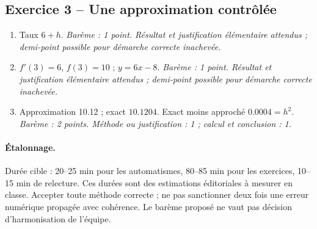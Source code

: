 \subsection*{Exercice 3 -- Une approximation contrôlée}
\begin{enumerate}
\item Taux $6+h$. \textit{Barème : 1 point. Résultat et justification élémentaire attendus ; demi-point possible pour démarche correcte inachevée.}
\item $f\prime(3)=6$, $f(3)=10$ ; $y=6x-8$. \textit{Barème : 1 point. Résultat et justification élémentaire attendus ; demi-point possible pour démarche correcte inachevée.}
\item Approximation \num{10,12} ; exact $\num{10,1204}$. Exact moins approché $\num{0,0004}=h^2$. \textit{Barème : 2 points. Méthode ou justification : 1 ; calcul et conclusion : 1.}
\end{enumerate}
\paragraph{Étalonnage.} Durée cible : 20–25 min pour les automatismes, 80–85 min pour les exercices, 10–15 min de relecture. Ces durées sont des estimations éditoriales à mesurer en classe. Accepter toute méthode correcte ; ne pas sanctionner deux fois une erreur numérique propagée avec cohérence. Le barème proposé ne vaut pas décision d’harmonisation de l’équipe.
